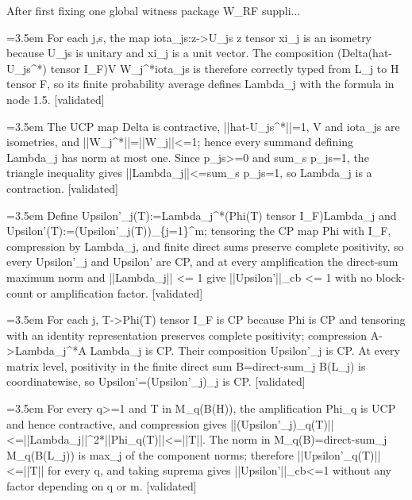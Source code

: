 \documentclass{article}
\newcommand{\step}[1]{\par\noindent\hangindent=3.5em\hangafter=1%
  \makebox[3.5em][l]{\textbf{#1.}}}
\newcommand{\steptag}[1]{\hfill{\small\textsf{[#1]}}}
\begin{document}
\begin{proofbox}{After first fixing one global witness package W\_RF suppli...}
\step{1.5.1} For each j,s, the map iota\_js:z->U\_js z tensor xi\_j is an isometry because U\_js is unitary and xi\_j is a unit vector. The composition (Delta(hat-U\_js\textasciicircum{}*) tensor I\_F)V W\_j\textasciicircum{}*iota\_js is therefore correctly typed from L\_j to H tensor F, so its finite probability average defines Lambda\_j with the formula in node 1.5. \steptag{validated} \\[4pt]
\step{1.5.2} The UCP map Delta is contractive, ||hat-U\_js\textasciicircum{}*||=1, V and iota\_js are isometries, and ||W\_j\textasciicircum{}*||=||W\_j||<=1; hence every summand defining Lambda\_j has norm at most one. Since p\_js>=0 and sum\_s p\_js=1, the triangle inequality gives ||Lambda\_j||<=sum\_s p\_js=1, so Lambda\_j is a contraction. \steptag{validated} \\[4pt]
\step{1.6} Define Upsilon'\_j(T):=Lambda\_j\textasciicircum{}*(Phi(T) tensor I\_F)Lambda\_j and Upsilon'(T):=(Upsilon'\_j(T))\_\{j=1\}\textasciicircum{}m; tensoring the CP map Phi with I\_F, compression by Lambda\_j, and finite direct sums preserve complete positivity, so every Upsilon'\_j and Upsilon' are CP, and at every amplification the direct-sum maximum norm and ||Lambda\_j|| <= 1 give ||Upsilon'||\_cb <= 1 with no block-count or amplification factor. \steptag{validated} \\[6pt]
\step{1.6.1} For each j, T->Phi(T) tensor I\_F is CP because Phi is CP and tensoring with an identity representation preserves complete positivity; compression A->Lambda\_j\textasciicircum{}*A Lambda\_j is CP. Their composition Upsilon'\_j is CP. At every matrix level, positivity in the finite direct sum B=direct-sum\_j B(L\_j) is coordinatewise, so Upsilon'=(Upsilon'\_j)\_j is CP. \steptag{validated} \\[4pt]
\step{1.6.2} For every q>=1 and T in M\_q(B(H)), the amplification Phi\_q is UCP and hence contractive, and compression gives ||(Upsilon'\_j)\_q(T)||<=||Lambda\_j||\textasciicircum{}2*||Phi\_q(T)||<=||T||. The norm in M\_q(B)=direct-sum\_j M\_q(B(L\_j)) is max\_j of the component norms; therefore ||Upsilon'\_q(T)||<=||T|| for every q, and taking suprema gives ||Upsilon'||\_cb<=1 without any factor depending on q or m. \steptag{validated} \\[4pt]
\end{proofbox}
\end{document}
